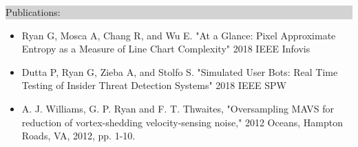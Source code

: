 \documentclass{article} %
\newcommand{\rsection}[1]{
\hspace{-0.4cm}
\colorbox{lightgrey}{
\begin{minipage}{1.07\linewidth}
\vspace{0.25cm}
\fontsize{14pt}{16pt}\selectfont #1 
\vspace{0.15cm}
\end{minipage}
}
\vspace*{-0.2cm}
}
\newcommand{\rjob}[2]{
\vspace{0.1cm}
\hspace*{-0.3cm}  
{\fontsize{10pt}{12pt}\selectfont #1} \hfill #2 
\vspace*{0.1cm} 
\hspace*{-1.2cm}
}
\newenvironment{ritemize}{
\hspace*{-0.8cm} 
\begin{minipage}{1.05\linewidth}
\begin{itemize}
}{
\end{itemize}
\end{minipage}
\vspace{-0.2cm}
}
\newcommand{\ritem}{
\item[-]
}
\begin{document}

\rsection{Publications:}

\begin{ritemize}
\ritem Ryan G, Mosca A, Chang R, and Wu E. "At a Glance: Pixel Approximate Entropy as a Measure of Line Chart Complexity" 2018 IEEE Infovis 
\ritem Dutta P, Ryan G, Zieba A, and Stolfo S. "Simulated User Bots: Real Time Testing of Insider Threat Detection Systems" 2018 IEEE SPW 
\ritem A. J. Williams, G. P. Ryan and F. T. Thwaites, "Oversampling MAVS for reduction of vortex-shedding velocity-sensing noise," 2012 Oceans, Hampton Roads, VA, 2012, pp. 1-10.
\end{ritemize}



\end{document}
